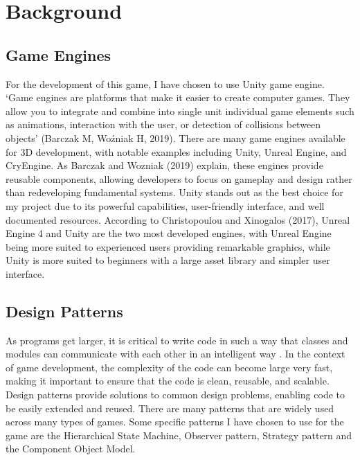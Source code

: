 \documentclass[]{final_report}
\begin{document}
\chapter{Background}
\section{Game Engines}
For the development of this game, I have chosen to use Unity game engine. `Game engines are platforms that make it easier to create computer games. They allow you to integrate and combine into single unit individual game elements such as animations, interaction with the user, or detection of collisions between objects' (Barczak M, Woźniak H, 2019). There are many game engines available for 3D development, with notable examples including Unity, Unreal Engine, and CryEngine. As Barczak and Wozniak (2019) explain, these engines provide reusable components, allowing developers to focus on gameplay and design rather than redeveloping fundamental systems. Unity stands out as the best choice for my project due to its powerful capabilities, user-friendly interface, and well documented resources. According to Christopoulou and Xinogalos (2017), Unreal Engine 4 and Unity are the two most developed engines, with Unreal Engine being more suited to experienced users providing remarkable graphics, while Unity is more suited to beginners with a large asset library and simpler user interface.
\section{Design Patterns}
As programs get larger, it is critical to write code in such a way that classes and modules can communicate with each other in an intelligent way \cite{alma997871033502671}. In the context of game development, the complexity of the code can become large very fast, making it important to ensure that the code is clean, reusable, and scalable. Design patterns provide solutions to common design problems, enabling code to be easily extended and reused. There are many patterns that are widely used across many types of games. Some specific patterns I have chosen to use for the game are the Hierarchical State Machine, Observer pattern, Strategy pattern and the Component Object Model. 
\end{document}
